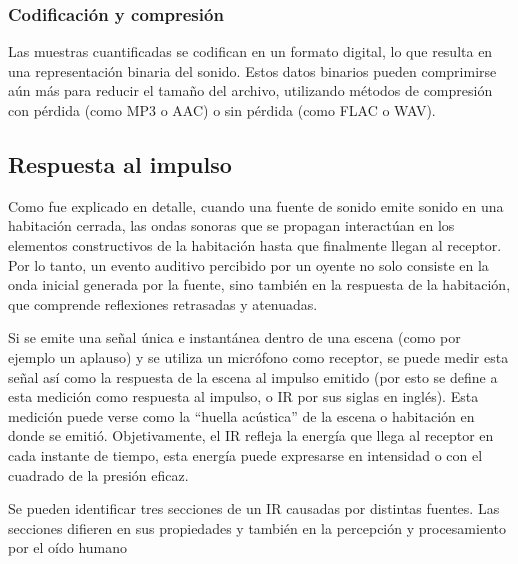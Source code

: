\documentclass{prgrado}
\begin{document}
\subsubsection{Codificación y compresión}

Las muestras cuantificadas se codifican en un formato digital, lo que resulta en una representación binaria del sonido. Estos datos binarios pueden comprimirse aún más para reducir el tamaño del archivo, utilizando métodos de compresión con pérdida (como MP3 o AAC) o sin pérdida (como FLAC o WAV).

\subsection{Respuesta al impulso}

Como fue explicado en detalle, cuando una fuente de sonido emite sonido en una habitación cerrada, las ondas sonoras que se propagan interactúan en los elementos constructivos de la habitación hasta que finalmente llegan al receptor. Por lo tanto, un evento auditivo percibido por un oyente no solo consiste en la onda inicial generada por la fuente, sino también en la respuesta de la habitación, que comprende reflexiones retrasadas y atenuadas. 

Si se emite una señal única e instantánea dentro de una escena (como por ejemplo un aplauso) y se utiliza un micrófono como receptor, se puede medir esta señal así como la respuesta de la escena al impulso emitido (por esto se define a esta medición como respuesta al impulso, o IR por sus siglas en inglés). Esta medición puede verse como la “huella acústica” de la escena o habitación en donde se emitió. Objetivamente, el IR refleja la energía que llega al receptor en cada instante de tiempo, esta energía puede expresarse en intensidad o con el cuadrado de la presión eficaz.

Se pueden identificar tres secciones de un IR causadas por distintas fuentes. Las secciones difieren en sus propiedades y también en la percepción y procesamiento por el oído humano
\end{document}
